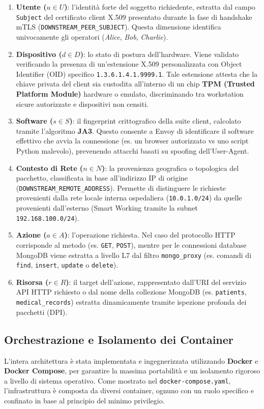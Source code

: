 \begin{enumerate}
    \item \textbf{Utente ($u \in U$)}: l'identità forte del soggetto richiedente, estratta dal campo \texttt{Subject} del certificato client X.509 presentato durante la fase di handshake mTLS (\texttt{DOWNSTREAM\_PEER\_SUBJECT}). Questa dimensione identifica univocamente gli operatori (\textit{Alice}, \textit{Bob}, \textit{Charlie}).
    \item \textbf{Dispositivo ($d \in D$)}: lo stato di postura dell'hardware. Viene validato verificando la presenza di un'estensione X.509 personalizzata con Object Identifier (OID) specifico \texttt{1.3.6.1.4.1.9999.1}. Tale estensione attesta che la chiave privata del client sia custodita all'interno di un chip \textbf{TPM (Trusted Platform Module)} hardware o emulato, discriminando tra workstation sicure autorizzate e dispositivi non censiti.
    \item \textbf{Software ($s \in S$)}: il fingerprint crittografico della suite client, calcolato tramite l'algoritmo \textbf{JA3}. Questo consente a Envoy di identificare il software effettivo che avvia la connessione (es. un browser autorizzato vs uno script Python malevolo), prevenendo attacchi basati su spoofing dell'User-Agent.
    \item \textbf{Contesto di Rete ($n \in N$)}: la provenienza geografica o topologica del pacchetto, classificata in base all'indirizzo IP di origine (\texttt{DOWNSTREAM\_REMOTE\_ADDRESS}). Permette di distinguere le richieste provenienti dalla rete locale interna ospedaliera (\texttt{10.0.1.0/24}) da quelle provenienti dall'esterno (Smart Working tramite la subnet \texttt{192.168.100.0/24}).
    \item \textbf{Azione ($a \in A$)}: l'operazione richiesta. Nel caso del protocollo HTTP corrisponde al metodo (es. \texttt{GET}, \texttt{POST}), mentre per le connessioni database MongoDB viene estratta a livello L7 dal filtro \texttt{mongo\_proxy} (es. comandi di \texttt{find}, \texttt{insert}, \texttt{update} o \texttt{delete}).
    \item \textbf{Risorsa ($r \in R$)}: il target dell'azione, rappresentato dall'URI del servizio API HTTP richiesto o dal nome della collezione MongoDB (es. \texttt{patients}, \texttt{medical\_records}) estratta dinamicamente tramite ispezione profonda dei pacchetti (DPI).
\end{enumerate}

\subsection{Orchestrazione e Isolamento dei Container}
L'intera architettura è stata implementata e ingegnerizzata utilizzando \textbf{Docker} e \textbf{Docker Compose}, per garantire la massima portabilità e un isolamento rigoroso a livello di sistema operativo. Come mostrato nel \texttt{docker-compose.yaml}, l'infrastruttura è composta da diversi container, ognuno con un ruolo specifico e confinato in base al principio del minimo privilegio.

